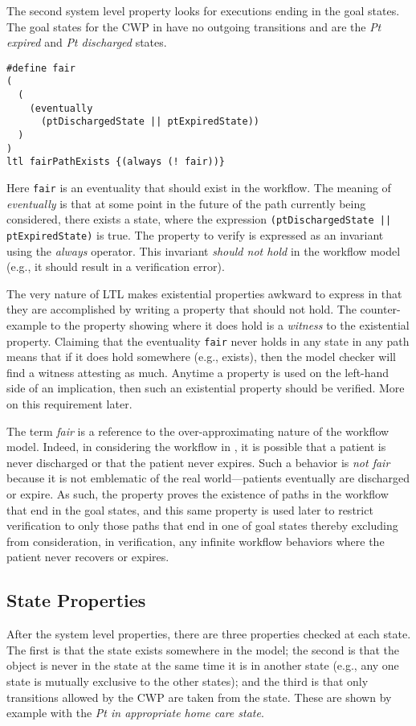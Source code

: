 The second system level property looks for executions ending in the goal states. The goal states for the CWP in  have no outgoing transitions and are the \emph{Pt expired} and \emph{Pt discharged} states.
%
{\small
\begin{lstlisting}[style=myPromela]
#define fair
(
  (
    (eventually 
      (ptDischargedState || ptExpiredState))
  )
)
ltl fairPathExists {(always (! fair))}
\end{lstlisting}
}
%
\noindent Here \texttt{fair} is an eventuality that should exist in the workflow. The meaning of \emph{eventually} is that at some point in the future of the path currently being considered, there exists a state, where the expression \texttt{(ptDischargedState || ptExpiredState)} is true. The property to verify is expressed as an invariant using the \emph{always} operator. This invariant \emph{should not hold} in the workflow model (e.g., it should result in a verification error). 

The very nature of LTL makes existential properties awkward to express in that they are accomplished by writing a property that should not hold. The counter-example to the property showing where it does hold is a \emph{witness} to the existential property. Claiming that the eventuality \texttt{fair} never holds in any state in any path means that if it does hold somewhere (e.g., exists), then the model checker will find a witness attesting as much. Anytime a property is used on the left-hand side of an implication, then such an existential property should be verified. More on this requirement later.

The term \emph{fair} is a reference to the over-approximating nature of the workflow model. Indeed, in considering the workflow in , it is possible that a patient is never discharged or that the patient never expires. Such a behavior is \emph{not fair} because it is not emblematic of the real world---patients eventually are discharged or expire. As such, the property proves the existence of paths in the workflow that end in the goal states, and this same property is used later to restrict verification to only those paths that end in one of goal states thereby excluding from consideration, in verification, any infinite workflow behaviors where the patient never recovers or expires.

\subsection{State Properties}
After the system level properties, there are three properties checked at each state. The first is that the state exists somewhere in the model; the second is that the object is never in the state at the same time it is in another state (e.g., any one state is mutually exclusive to the other states); and the third is that only transitions allowed by the CWP are taken from the state. These are shown by example with the \emph{Pt in appropriate home care state}.

